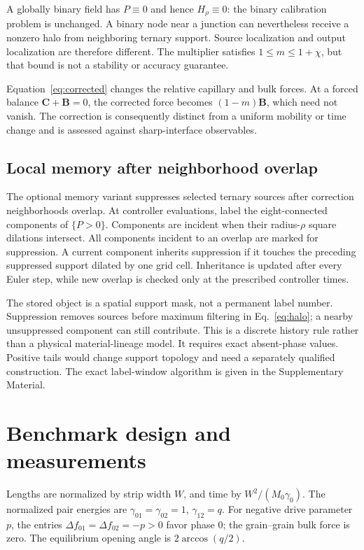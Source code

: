 A globally binary field has $P\equiv0$ and hence $H_\rho\equiv0$: the binary calibration problem is unchanged. A binary node near a junction can nevertheless receive a nonzero halo from neighboring ternary support. Source localization and output localization are therefore different. The multiplier satisfies $1\leq m\leq1+\chi$, but that bound is not a stability or accuracy guarantee.

Equation~\eqref{eq:corrected} changes the relative capillary and bulk forces. At a forced balance $\mathbf C+\mathbf B=0$, the corrected force becomes $(1-m)\mathbf B$, which need not vanish. The correction is consequently distinct from a uniform mobility or time change and is assessed against sharp-interface observables.

\subsection{Local memory after neighborhood overlap}
The optional memory variant suppresses selected ternary sources after correction neighborhoods overlap. At controller evaluations, label the eight-connected components of $\{P>0\}$. Components are incident when their radius-$\rho$ square dilations intersect. All components incident to an overlap are marked for suppression. A current component inherits suppression if it touches the preceding suppressed support dilated by one grid cell. Inheritance is updated after every Euler step, while new overlap is checked only at the prescribed controller times.

The stored object is a spatial support mask, not a permanent label number. Suppression removes sources before maximum filtering in Eq.~\eqref{eq:halo}; a nearby unsuppressed component can still contribute. This is a discrete history rule rather than a physical material-lineage model. It requires exact absent-phase values. Positive tails would change support topology and need a separately qualified construction. The exact label-window algorithm is given in the Supplementary Material.

\section{Benchmark design and measurements}
Lengths are normalized by strip width $W$, and time by $W^2/(M_0\gamma_0)$. The normalized pair energies are $\gamma_{01}=\gamma_{02}=1$, $\gamma_{12}=q$. For negative drive parameter $p$, the entries $\Delta f_{01}=\Delta f_{02}=-p>0$ favor phase 0; the grain--grain bulk force is zero. The equilibrium opening angle is $2\arccos(q/2)$.

